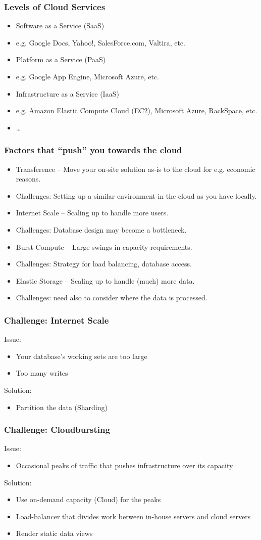 \documentclass[10pt]{beamer}
\def\subitem{\item[\hspace{1.5cm} -]}
\begin{document}
\begin{frame}[t]
\frametitle{Levels of Cloud Services}
\begin{itemize}
\item Software as a Service (SaaS)
\subitem e.g. Google Docs, Yahoo!, SalesForce.com, Valtira, etc.
\item Platform as a Service (PaaS)
\subitem e.g. Google App Engine, Microsoft Azure, etc.
\item Infrastructure as a Service (IaaS)
\subitem e.g. Amazon Elastic Compute Cloud (EC2), Microsoft Azure, RackSpace, etc.
\item \ldots
\end{itemize}
\end{frame}

\begin{frame}[t]
\frametitle{Factors that ``push'' you towards the cloud}
\begin{itemize}
\item Transference -- Move your on-site solution as-is to the cloud for e.g. economic reasons.
\subitem Challenges: Setting up a similar environment in the cloud as you have locally.
\item Internet Scale -- Scaling up to handle more users.
\subitem Challenges: Database design may become a bottleneck.
\item Burst Compute -- Large swings in capacity requirements.
\subitem Challenges: Strategy for load balancing, database access.
\item Elastic Storage -- Scaling up to handle (much) more data.
\subitem Challenges: need also to consider where the data is processed.
\end{itemize}
\end{frame}

\begin{frame}[t]
\frametitle{Challenge: Internet Scale}
Issue:
\begin{itemize}
\item Your database's working sets are too large
\item Too many writes
\end{itemize}

Solution:
\begin{itemize}
\item Partition the data (Sharding)
\end{itemize}
\end{frame}

\begin{frame}[t]
\frametitle{Challenge: Cloudbursting}
Issue:
\begin{itemize}
\item Occasional peaks of traffic that pushes infrastructure over its capacity
\end{itemize}

Solution:
\begin{itemize}
\item Use on-demand capacity (Cloud) for the peaks
\item Load-balancer that divides work between in-house servers and cloud servers
\item Render static data views
\end{itemize}
\end{frame}
\end{document}
